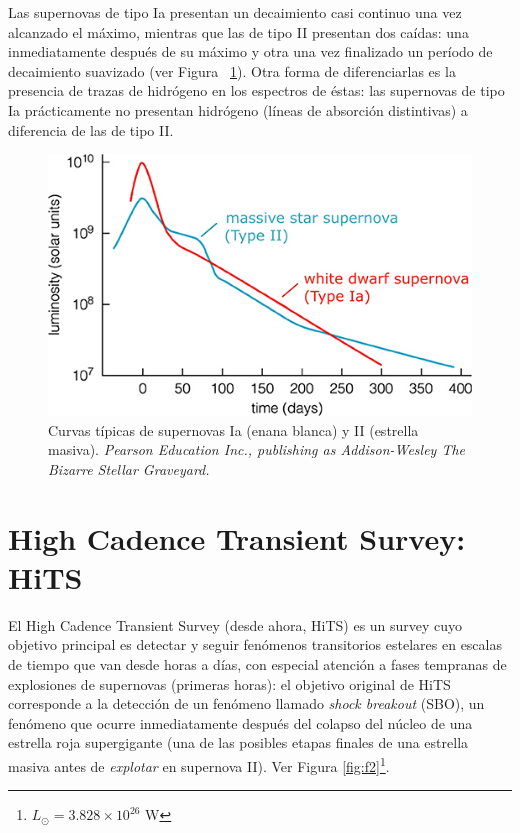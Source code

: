 Las supernovas de tipo Ia presentan un decaimiento casi continuo una vez alcanzado el m\'aximo, mientras que las de tipo II presentan dos ca\'idas: una inmediatamente despu\'es de su m\'aximo y otra una vez finalizado un per\'iodo de decaimiento suavizado (ver Figura ~\ref{fig:f1}). Otra forma de diferenciarlas es la presencia de trazas de hidr\'ogeno en los espectros de \'estas: las supernovas de tipo Ia pr\'acticamente no presentan hidr\'ogeno (l\'ineas de absorci\'on distintivas) a diferencia de las de tipo II.\bigskip

\begin{figure}[h!]
\centering
\includegraphics[scale=.8]{images/clear}
\caption{Curvas t\'ipicas de supernovas Ia (enana blanca) y II (estrella masiva). \textit{ Pearson Education Inc., publishing as Addison-Wesley The Bizarre Stellar Graveyard.}}
\label{fig:f1}
\end{figure}


\section{High Cadence Transient Survey: HiTS}

El High Cadence Transient Survey\cite{hits} (desde ahora, HiTS) es un survey cuyo objetivo principal es detectar y seguir fen\'omenos transitorios estelares en escalas de tiempo que van desde horas a d\'ias, con especial atenci\'on a fases tempranas de explosiones de supernovas (primeras horas): el objetivo original de HiTS corresponde a la detecci\'on de un fen\'omeno llamado \textit{shock breakout} (SBO), un fen\'omeno que ocurre inmediatamente despu\'es del colapso del n\'ucleo de una estrella roja supergigante (una de las posibles etapas finales de una estrella masiva antes de \textit{explotar} en supernova II). Ver Figura \ref{fig:f2}\footnote{$L_{\odot}= 3.828 \times 10^{26}$ W}.

